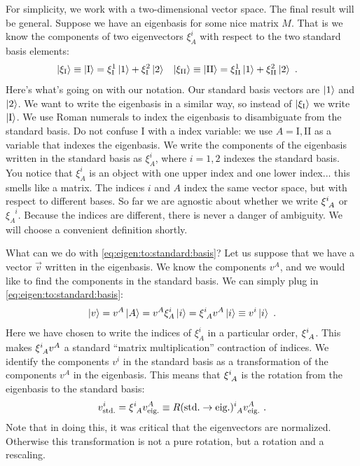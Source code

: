 \documentclass[12pt]{article}
\begin{document}
For simplicity, we work with a two-dimensional vector space. The final result will be general. Suppose we have an eigenbasis for some nice matrix $M$. That is we know the components of two eigenvectors $\xi^i_{A}$ with respect to the two standard basis elements:
\begin{align}
    \left|\xi_\textnormal{I}\right\rangle \equiv \left|\textnormal{I}\right\rangle 
    & = 
    \xi^1_\textnormal{I} \left|1\right\rangle
    +
    \xi^2_\textnormal{I} \left|2\right\rangle
    &
    \left|\xi_\textnormal{II}\right\rangle \equiv \left|\textnormal{II}\right\rangle 
    & = 
    \xi^1_\textnormal{II} \left|1\right\rangle
    +
    \xi^2_\textnormal{II} \left|2\right\rangle \ .
    \label{eq:eigen:to:standard:basis}
\end{align}
Here's what's going on with our notation. Our standard basis vectors are $\left|1\right\rangle$ and $\left|2\right\rangle$. We want to write the eigenbasis in a similar way, so instead of $\left|\xi_\textnormal{I}\right\rangle$ we write $\left|\textnormal{I}\right\rangle$. We use Roman numerals to index the eigenbasis to disambiguate from the standard basis. Do not confuse $\text{I}$ with a index variable: we use $A = \text{I}, \text{II}$ as a variable that indexes the eigenbasis. We write the components of the eigenbasis written in the standard basis as $\xi^i_A$, where $i=1,2$ indexes the standard basis. You notice that $\xi^i_A$ is an object with one upper index and one lower index... this smells like a matrix. The indices $i$ and $A$ index the same vector space, but with respect to different bases. So far we are agnostic about whether we write $\xi\aij{i}{A}$ or $\xi_A^{\phantom{A}i}$. Because the indices are different, there is never a danger of ambiguity. We will choose a convenient definition shortly.

What can we do with \eqref{eq:eigen:to:standard:basis}? Let us suppose that we have a vector $\vec{v}$ written in the eigenbasis. We know the components $v^A$, and we would like to find the components in the standard basis. We can simply plug in \eqref{eq:eigen:to:standard:basis}:
\begin{align}
    \ket{v} = 
    v^A\ket{A}
    = v^A \xi_A^i \ket{i} =  \xi\aij{i}{A}v^A \ket{i}
    \equiv v^i \ket{i} \ .
    \label{eq:vA:as:vi}
\end{align}
Here we have chosen to write the indices of $\xi^i_A$ in a particular order, $\xi\aij{i}{A}$. This makes $\xi\aij{i}{A}v^A$ a standard ``matrix multiplication'' contraction of indices. We identify the components $v^i$ in the standard basis as a transformation of the components $v^A$ in the eigenbasis. This means that $\xi\aij{i}{A}$ is the rotation from the eigenbasis to the standard basis:
\begin{align}
    v^i_\text{std.} = \xi\aij{i}{A}v^A_\text{eig.} \equiv R(\text{std.}\to\text{eig.})\aij{i}{A}v^A_\text{eig.} \ .
\end{align}
Note that in doing this, it was critical that the eigenvectors are normalized. Otherwise this transformation is not a pure rotation, but a rotation and a rescaling. 
\end{document}
